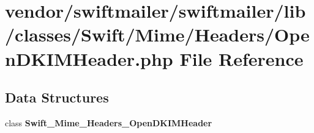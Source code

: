 \section{vendor/swiftmailer/swiftmailer/lib/classes/\+Swift/\+Mime/\+Headers/\+Open\+D\+K\+I\+M\+Header.php File Reference}
\label{_open_d_k_i_m_header_8php}
\subsection*{Data Structures}
\begin{DoxyCompactItemize}
\item 
class {\bf Swift\+\_\+\+Mime\+\_\+\+Headers\+\_\+\+Open\+D\+K\+I\+M\+Header}
\end{DoxyCompactItemize}
